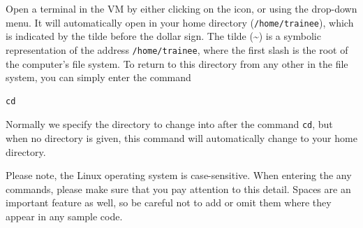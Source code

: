 \begin{steps}
Open a terminal in the VM by either clicking on the icon, or using the drop-down menu.
It will automatically open in your home directory (\texttt{/home/trainee}), which is indicated by the tilde before the dollar sign.
The tilde (\~{}) is a symbolic representation of the address \texttt{/home/trainee}, where the first slash is the root of the computer’s file system.
To return to this directory from any other in the file system, you can simply enter the command
\begin{lstlisting}
cd 
\end{lstlisting}
\end{steps}


Normally we specify the directory to change into after the command \texttt{cd}, but when no directory is given, this command will automatically change to your home directory.\\

\begin{warning}
Please note, the Linux operating system is case-sensitive.
When entering the any commands, please make sure that you pay attention to this detail.
Spaces are an important feature as well, so be careful not to add or omit them where they appear in any sample code.
\end{warning}